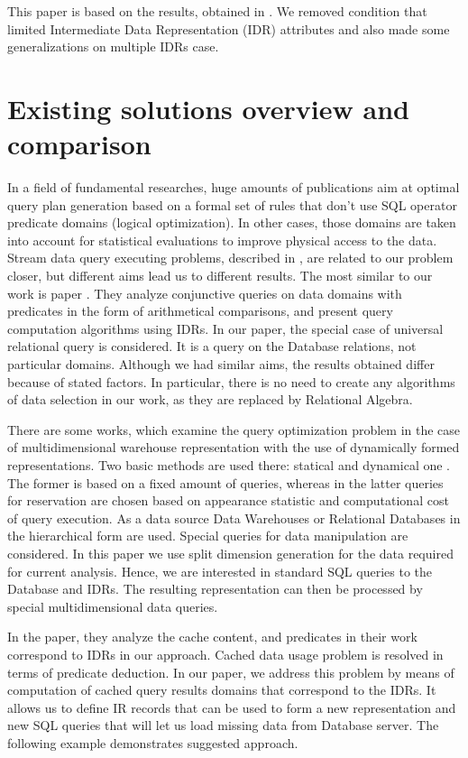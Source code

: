 \documentclass[10pt,a4paper]{article}
\begin{document}
This paper is based on the results, obtained in \cite{zyk_pol}. We removed
condition that limited Intermediate Data Representation (IDR) attributes and
also made some generalizations on multiple IDRs case.

\section{Existing solutions overview and comparison}

In a field of fundamental researches, huge amounts of publications aim at optimal
query plan generation based on a formal set of rules that don't use SQL
operator predicate domains (logical optimization). In other cases, those domains
are taken into account for statistical evaluations to improve physical access to
the data. Stream data query executing problems, described in \cite{Olston03,
Denny05}, are related to our problem closer, but different aims lead us to
different results. The most similar to our work is paper \cite{Afrati06}. They
analyze conjunctive queries on data domains with predicates in the form of
arithmetical comparisons, and present query computation algorithms using IDRs. In
our paper, the special case of universal relational query is considered. It is a
query on the Database relations, not particular domains. Although we had similar
aims, the results obtained differ because of stated factors. In particular,
there is no need to create any algorithms of data selection in our work, as they
are replaced by Relational Algebra.

There are some works, which examine the query optimization problem in the case of
multidimensional warehouse representation with the use of dynamically formed
representations. Two basic methods are used there: statical \cite{baralis,
gupta, gupta-mumick} and dynamical one \cite{scheuermann, shim, kalnis, chang}.
The former is based on a fixed amount of queries, whereas in the latter queries
for reservation are chosen based on appearance statistic and computational cost
of query execution. As a data source Data Warehouses or Relational Databases in
the hierarchical form are used. Special queries for data manipulation are
considered. In this paper we use split dimension generation for the data
required for current analysis. Hence, we are interested in standard SQL queries
to the Database and IDRs. The resulting representation can then be processed by
special multidimensional data queries.

In the \cite{Keller96} paper, they analyze the cache content,
and predicates in their work correspond to IDRs in our approach. Cached data
usage problem is resolved in terms of predicate deduction. In our paper, we address this problem by means of
computation of cached query results domains that correspond to the IDRs. It allows
us to define IR records that can be used to form a new representation and new SQL
queries that will let us load missing data from Database server. The following
example demonstrates suggested approach.
\end{document}
